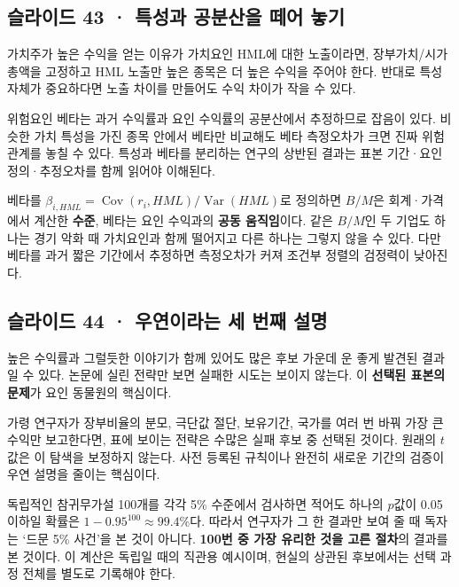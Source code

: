 \documentclass[11pt,a4paper]{article}
\begin{document}
\subsection{슬라이드 43 · 특성과 공분산을 떼어 놓기}
가치주가 높은 수익을 얻는 이유가 가치요인 HML에 대한 노출이라면, 장부가치/시가총액을 고정하고 HML 노출만 높은 종목은 더 높은 수익을 주어야 한다. 반대로 특성 자체가 중요하다면 노출 차이를 만들어도 수익 차이가 작을 수 있다.\par

위험요인 베타는 과거 수익률과 요인 수익률의 공분산에서 추정하므로 잡음이 있다. 비슷한 가치 특성을 가진 종목 안에서 베타만 비교해도 베타 측정오차가 크면 진짜 위험 관계를 놓칠 수 있다. 특성과 베타를 분리하는 연구의 상반된 결과는 표본 기간·요인 정의·추정오차를 함께 읽어야 이해된다.\par

베타를 $\beta_{i,HML}=\operatorname{Cov}(r_i,HML)/\operatorname{Var}(HML)$로 정의하면 $B/M$은 회계·가격에서 계산한 \textbf{수준}, 베타는 요인 수익과의 \textbf{공동 움직임}이다. 같은 $B/M$인 두 기업도 하나는 경기 악화 때 가치요인과 함께 떨어지고 다른 하나는 그렇지 않을 수 있다. 다만 베타를 과거 짧은 기간에서 추정하면 측정오차가 커져 조건부 정렬의 검정력이 낮아진다.\par

\subsection{슬라이드 44 · 우연이라는 세 번째 설명}
높은 수익률과 그럴듯한 이야기가 함께 있어도 많은 후보 가운데 운 좋게 발견된 결과일 수 있다. 논문에 실린 전략만 보면 실패한 시도는 보이지 않는다. 이 \textbf{선택된 표본의 문제}가 요인 동물원의 핵심이다.\par

가령 연구자가 장부비율의 분모, 극단값 절단, 보유기간, 국가를 여러 번 바꿔 가장 큰 수익만 보고한다면, 표에 보이는 전략은 수많은 실패 후보 중 선택된 것이다. 원래의 $t$값은 이 탐색을 보정하지 않는다. 사전 등록된 규칙이나 완전히 새로운 기간의 검증이 우연 설명을 줄이는 핵심이다.\par

독립적인 참귀무가설 100개를 각각 5\% 수준에서 검사하면 적어도 하나의 $p$값이 0.05 이하일 확률은 $1-0.95^{100}\approx99.4\%$다. 따라서 연구자가 그 한 결과만 보여 줄 때 독자는 ‘드문 5\% 사건’을 본 것이 아니다. \textbf{100번 중 가장 유리한 것을 고른 절차}의 결과를 본 것이다. 이 계산은 독립일 때의 직관용 예시이며, 현실의 상관된 후보에서는 선택 과정 전체를 별도로 기록해야 한다.\par
\end{document}
